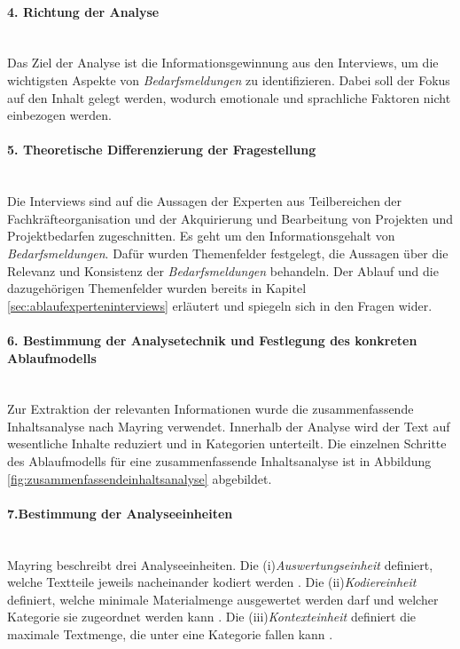 \paragraph{4. Richtung der Analyse}\mbox{} \\
Das Ziel der Analyse ist die Informationsgewinnung aus den Interviews, um die wichtigsten Aspekte von \emph{Bedarfsmeldungen} zu identifizieren. Dabei soll der Fokus auf den Inhalt gelegt werden, wodurch emotionale und sprachliche Faktoren nicht einbezogen werden.
\paragraph{5. Theoretische Differenzierung der Fragestellung}\mbox{} \\
Die Interviews sind auf die Aussagen der Experten aus Teilbereichen der Fachkräfteorganisation und der Akquirierung und Bearbeitung von Projekten und Projektbedarfen zugeschnitten. Es geht um den Informationsgehalt von \emph{Bedarfsmeldungen}. Dafür wurden Themenfelder festgelegt, die Aussagen über die Relevanz und Konsistenz der \emph{Bedarfsmeldungen} behandeln. Der Ablauf und die dazugehörigen Themenfelder wurden bereits in Kapitel \ref{sec:ablaufexperteninterviews} erläutert und spiegeln sich in den Fragen wider.
\paragraph{6. Bestimmung der Analysetechnik und Festlegung des konkreten Ablaufmodells}\mbox{} \\
Zur Extraktion der relevanten Informationen wurde die zusammenfassende Inhaltsanalyse nach Mayring verwendet. Innerhalb der Analyse wird der Text auf wesentliche Inhalte reduziert und in Kategorien unterteilt. Die einzelnen Schritte des Ablaufmodells für eine zusammenfassende Inhaltsanalyse ist in Abbildung \ref{fig:zusammenfassendeinhaltsanalyse} abgebildet.
\paragraph{7.Bestimmung der Analyseeinheiten}\mbox{} \\
Mayring beschreibt drei Analyseeinheiten. Die (i)\emph{Auswertungseinheit} definiert, welche Textteile jeweils nacheinander kodiert werden \cite{mayring1994qualitative}. Die (ii)\emph{Kodiereinheit} definiert, welche minimale Materialmenge ausgewertet werden darf und welcher Kategorie sie zugeordnet werden kann \cite{mayring1994qualitative}. Die (iii)\emph{Kontexteinheit} definiert die maximale Textmenge, die unter eine Kategorie fallen kann \cite{mayring1994qualitative}.\\


